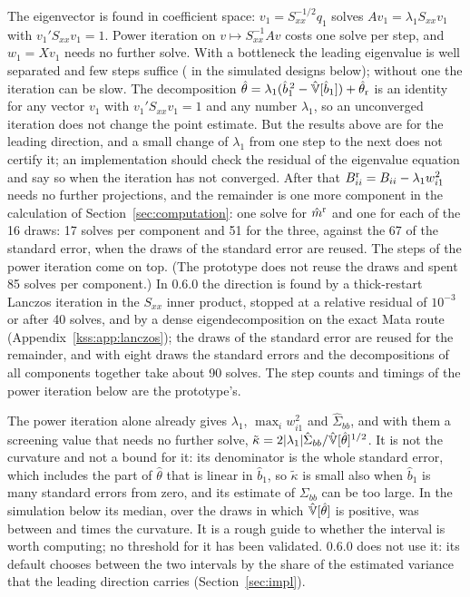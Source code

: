 The eigenvector is found in coefficient space: $v_1=S_{xx}^{-1/2}q_1$ solves $Av_1=\lambda_1S_{xx}v_1$ with
$v_1'S_{xx}v_1=1$. Power iteration on $v\mapsto S_{xx}^{-1}Av$ costs one solve per step, and $w_1=Xv_1$ needs no
further solve. With a bottleneck the leading eigenvalue is well separated and few steps suffice
( in the simulated designs below); without one the iteration can be slow. The decomposition
$\hat\theta=\lambda_1(\hat b_1^{\,2}-\hat{\mathbb{V}}[\hat b_1])+\hat\theta_{\rm r}$ is an identity for any vector $v_1$ with
$v_1'S_{xx}v_1=1$ and any number $\lambda_1$, so an unconverged iteration does not change the point estimate.
But the results above are for the leading direction, and a small change of $\lambda_1$ from one step to the
next does not certify it; an implementation should check the residual of the eigenvalue equation and say so
when the iteration has not converged. After that $B^{\rm r}_{ii}=B_{ii}-\lambda_1w_{i1}^2$ needs no further
projections, and the remainder is one more component in the calculation of Section~\ref{sec:computation}: one
solve for $\hat m^{\rm r}$ and one for each of the 16 draws: 17 solves per component and 51 for the three, against
the 67 of the standard error, when the draws of the standard error are reused. The steps of the power iteration
come on top. (The prototype does not reuse the draws and spent 85 solves per component.) In \fevc{} 0.6.0 the
direction is found by a thick-restart Lanczos iteration in the $S_{xx}$ inner product, stopped at a relative
residual of $10^{-3}$ or after 40 solves, and by a dense eigendecomposition on the exact Mata route
(Appendix~\ref{kss:app:lanczos}); the draws of the standard error are reused for the remainder, and with eight
draws the standard errors and the decompositions of all components together take about 90 solves. The step counts
and timings of the power iteration below are the prototype's.

The power iteration alone already gives $\lambda_1$, $\max_iw_{i1}^2$ and $\hat\Sigma_{bb}$, and with them a
screening value that needs no further solve,
$\tilde\kappa=2|\lambda_1|\hat\Sigma_{bb}/\hat{\mathbb{V}}[\hat\theta]^{1/2}$. It is not the curvature and not a bound for it:
its denominator is the whole standard error, which includes the part of $\hat\theta$ that is linear in $\hat b_1$,
so $\tilde\kappa$ is small also when $\hat b_1$ is many standard errors from zero, and its estimate of
$\Sigma_{bb}$ can be too large. In the simulation below its median, over the draws in which
$\hat{\mathbb{V}}[\hat\theta]$ is positive, was between  and  times the
curvature. It is a rough guide to whether the interval is worth computing; no
threshold for it has been validated. \fevc{} 0.6.0 does not use it: its default chooses between the two intervals
by the share of the estimated variance that the leading direction carries (Section~\ref{sec:impl}).

